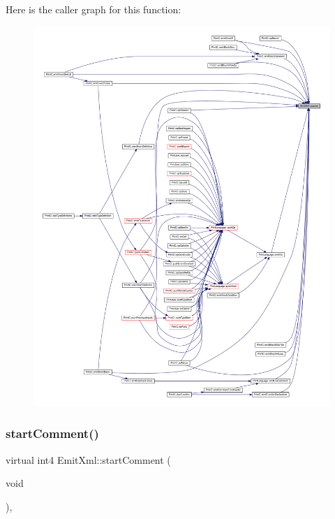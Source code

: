 Here is the caller graph for this function\+:
\nopagebreak
\begin{figure}[H]
\begin{center}
\leavevmode
\includegraphics[width=350pt]{class_emit_xml_ab2e3fc4934aade587c0b5a8706c9dfa0_icgraph}
\end{center}
\end{figure}
\mbox{\label{class_emit_xml_a4b5198be36bbd5b170206affef1d21d0}} 
\subsubsection{\texorpdfstring{startComment()}{startComment()}}
{\footnotesize\ttfamily virtual int4 Emit\+Xml\+::start\+Comment (\begin{DoxyParamCaption}\item[{void}]{ }\end{DoxyParamCaption})\hspace{0.3cm}{\ttfamily [inline]}, {\ttfamily [virtual]}}



